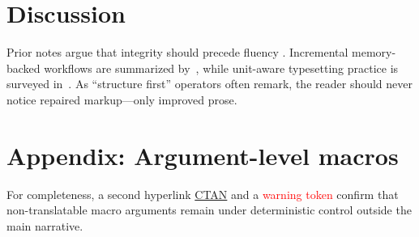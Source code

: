 \documentclass[11pt]{article}
\begin{document}
\section{Discussion}
\label{sec:discussion}

Prior notes argue that integrity should precede fluency
\cite{integrity2024}. Incremental memory-backed workflows are summarized
by~\cite[see][§2]{workflow2025}, while unit-aware typesetting practice is
surveyed in~\cite{units2023}. As \enquote{structure first} operators often
remark, the reader should never notice repaired markup---only improved prose.

\section*{Appendix: Argument-level macros}
\label{sec:appendix}

For completeness, a second hyperlink
\href{https://ctan.org/}{CTAN} and a
\textcolor{red}{warning token} confirm that non-translatable macro arguments
remain under deterministic control outside the main narrative.

\printbibliography
\end{document}
